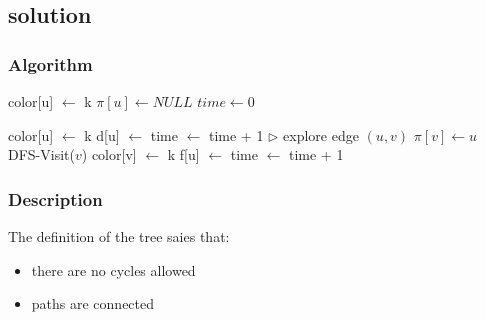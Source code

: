 \subsection{solution}

\subsubsection{Algorithm}
\begin{algorithmic}
   \State 
       \State color[u] $\gets$ k
       \State $\pi[u] \gets NULL$
    \State $time \gets 0$
\EndFunction
\end{algorithmic}

\smallskip

\begin{algorithmic}
    \State color[u] $\gets$ k
    \State d[u] $\gets$ time $\gets$ time + 1
      \State $\triangleright$ explore edge $(u,v)$
          \State $\pi[v] \gets u$
          \State DFS-Visit($v$)
    \State color[v] $\gets$  k
    \State f[u] $\gets$ time $\gets$ time + 1
\EndFunction
\end{algorithmic}

\subsubsection{Description}
The definition of the tree saies that:
\begin{itemize}
 \item there are no cycles allowed
 \item paths are connected
\end{itemize}
